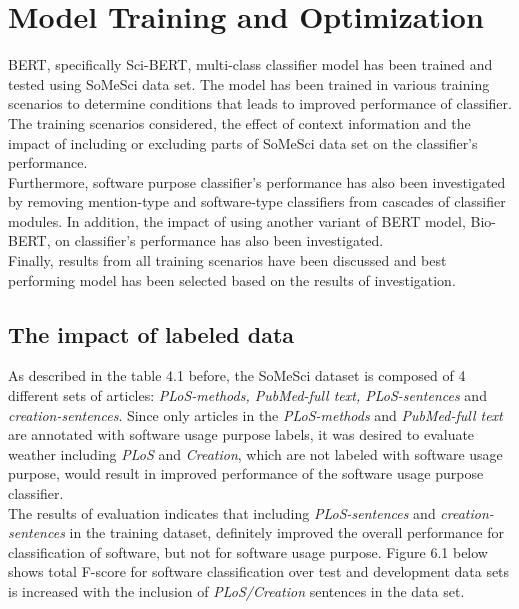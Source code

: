 \chapter{Model Training and Optimization}
\label{ch:chapter06}
 
%
%

\ac{BERT}, specifically \ac{Sci-BERT}, multi-class classifier model has been trained and tested using \ac{SoMeSci} data set. The model has been trained in various training scenarios to determine conditions that leads to improved performance of classifier. The training scenarios considered, the effect of context information  and the impact of including or excluding parts of \ac{SoMeSci} data set on the classifier’s performance.\\
 
Furthermore, software purpose classifier’s performance has also been investigated by removing mention-type and software-type classifiers from cascades of classifier modules.  In addition, the impact of using another variant of BERT model, \ac{Bio-BERT}, on classifier’s performance  has also been investigated. \\

Finally, results from all training scenarios have been discussed and best performing model has been selected based on the results of investigation.

\section{The impact of labeled data}
\label{sec:chapter06:exclusion}

As described in the table 4.1 before, the \ac{SoMeSci} dataset is composed of 4 different sets of articles: \emph{PLoS-methods, PubMed-full text,  PLoS-sentences} and \emph{creation-sentences}. Since only articles in the  \emph{PLoS-methods} and \emph{PubMed-full text} are annotated with software usage purpose labels, it was desired to evaluate weather including \emph{PLoS} and \emph{Creation}, which are not labeled with software usage purpose, would result in improved performance of the software usage purpose classifier.  \\

The results of evaluation indicates that including \emph{ PLoS-sentences} and \emph{creation-sentences} in the training dataset, definitely improved the overall performance for classification of software, but not for software usage purpose. Figure 6.1 below shows total F-score for software classification over test and development data sets is increased with the inclusion of \emph{PLoS/Creation} sentences in the data set. \\


